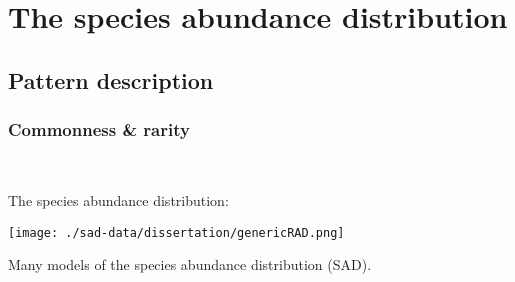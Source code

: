 \documentclass[14pt]{beamer}
\begin{document}
\section{The species abundance distribution}
\subsection{Pattern description}
\begin{frame}[t]{}
\frametitle{Commonness \& rarity}
~\\
\begin{large}
The species abundance distribution:
\end{large}
\begin{center}
\texttt{[image: ./sad-data/dissertation/genericRAD.png]}\\
\end{center}
Many models of the species abundance distribution (SAD).
\end{frame}
\end{document}

